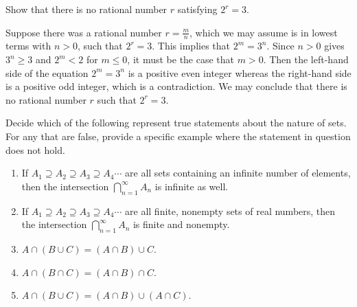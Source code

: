 \documentclass{lew98_solutions}
\begin{document}
\begin{exercise}
\label{ex:1.2.2}
    Show that there is no rational number \( r \) satisfying \( 2^r = 3 \).
\end{exercise}

\begin{solution}
    Suppose there was a rational number \( r = \tfrac{m}{n} \), which we may assume is in lowest terms with \( n > 0 \), such that \( 2^r = 3 \). This implies that \( 2^m = 3^n \). Since \( n > 0 \) gives \( 3^n \geq 3 \) and \( 2^m < 2 \) for \( m \leq 0 \), it must be the case that \( m > 0 \). Then the left-hand side of the equation \( 2^m = 3^n \) is a positive even integer whereas the right-hand side is a positive odd integer, which is a contradiction. We may conclude that there is no rational number \( r \) such that \( 2^r = 3 \).
\end{solution}

\begin{exercise}
\label{ex:1.2.3}
    Decide which of the following represent true statements about the nature of sets. For any that are false, provide a specific example where the statement in question does not hold.
    \begin{enumerate}
        \item If \( A_1 \supseteq A_2 \supseteq A_3 \supseteq A_4 \cdots \) are all sets containing an infinite number of elements, then the intersection \( \bigcap_{n=1}^{\infty} A_n \) is infinite as well.

        \item If \( A_1 \supseteq A_2 \supseteq A_3 \supseteq A_4 \cdots \) are all finite, nonempty sets of real numbers, then the intersection \( \bigcap_{n=1}^{\infty} A_n \) is finite and nonempty.

        \item \( A \cap (B \cup C) = (A \cap B) \cup C \).

        \item \( A \cap (B \cap C) = (A \cap B) \cap C \).

        \item \( A \cap (B \cup C) = (A \cap B) \cup (A \cap C) \).
    \end{enumerate}
\end{exercise}
\end{document}

